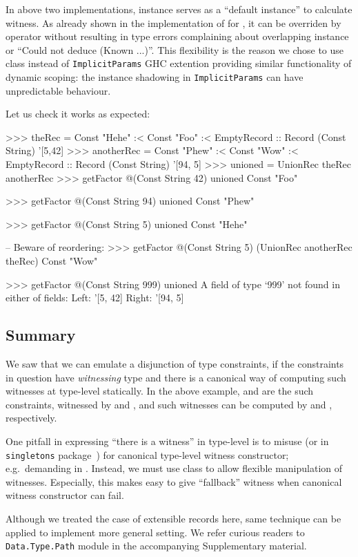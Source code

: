 \documentclass[demotion-paper.tex]{subfiles}
\begin{document}
In above two implementations,  instance serves as a ``default instance'' to calculate witness.
As already shown in the implementation of  for , it can be overriden by  operator without resulting in type errors complaining about overlapping instance or ``Could not deduce (Known ...)''.
This flexibility is the reason we chose to use  class instead of \texttt{ImplicitParams} GHC extention providing similar functionality of dynamic scoping:  the instance shadowing in \texttt{ImplicitParams} can have unpredictable behaviour.

Let us check it works as expected:

\begin{repl}
>>> theRec = Const "Hehe" :< Const "Foo"
      :< EmptyRecord
      :: Record (Const String) '[5,42]
>>> anotherRec = Const "Phew" :< Const "Wow"
      :< EmptyRecord
      :: Record (Const String) '[94, 5]
>>> unioned = UnionRec theRec anotherRec
>>> getFactor @(Const String 42) unioned
Const "Foo"

>>> getFactor @(Const String 94) unioned
Const "Phew"

>>> getFactor @(Const String 5) unioned
Const "Hehe"

-- Beware of reordering:
>>> getFactor @(Const String 5) 
      (UnionRec anotherRec theRec)
Const "Wow"

>>> getFactor @(Const String 999) unioned
A field of type `999' not found in either of fields:
   Left: '[5, 42]
  Right: '[94, 5]
\end{repl}

\subsection{Summary}
We saw that we can emulate a disjunction of type constraints, if the constraints in question have \emph{witnessing} type and there is a canonical way of computing such witnesses at type-level statically.
In the above example,  and  are the such constraints, witnessed by  and , and such witnesses can be computed by  and , respectively.

One pitfall in expressing ``there is a witness'' in type-level is to misuse  (or  in \texttt{singletons} package~\cite{singletons}) for canonical type-level witness constructor; e.g.\ demanding  in .
Instead, we must use  class to allow flexible manipulation of witnesses.
Especially, this makes easy to give ``fallback'' witness when canonical witness constructor can fail.

Although we treated the case of extensible records here, same technique can be applied to implement more general setting.
We refer curious readers to \texttt{Data.Type.Path} module in the accompanying Supplementary material. 
\end{document}
